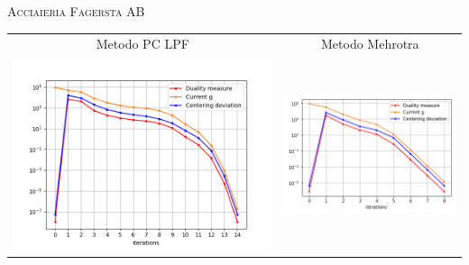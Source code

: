 \begin{frame}{\textsc{\LARGE \textcolor{iris}{Acciaieria Fagersta AB}}}
	\centering
	\begin{tabular}{c@{}c}
		\small{Metodo PC LPF} & \small{Metodo Mehrotra} \\
		\includegraphics[scale = 0.33]{swe_PCLPF}
		&\includegraphics[scale = 0.33]{swe_MER}\\ 
	\end{tabular}
\end{frame}


